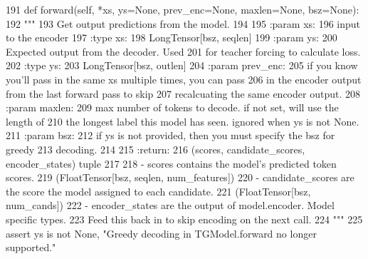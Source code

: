 \begin{DoxyCode}
191     \textcolor{keyword}{def }forward(self, *xs, ys=None, prev\_enc=None, maxlen=None, bsz=None):
192         \textcolor{stringliteral}{"""}
193 \textcolor{stringliteral}{        Get output predictions from the model.}
194 \textcolor{stringliteral}{}
195 \textcolor{stringliteral}{        :param xs:}
196 \textcolor{stringliteral}{            input to the encoder}
197 \textcolor{stringliteral}{        :type xs:}
198 \textcolor{stringliteral}{            LongTensor[bsz, seqlen]}
199 \textcolor{stringliteral}{        :param ys:}
200 \textcolor{stringliteral}{            Expected output from the decoder. Used}
201 \textcolor{stringliteral}{            for teacher forcing to calculate loss.}
202 \textcolor{stringliteral}{        :type ys:}
203 \textcolor{stringliteral}{            LongTensor[bsz, outlen]}
204 \textcolor{stringliteral}{        :param prev\_enc:}
205 \textcolor{stringliteral}{            if you know you'll pass in the same xs multiple times, you can pass}
206 \textcolor{stringliteral}{            in the encoder output from the last forward pass to skip}
207 \textcolor{stringliteral}{            recalcuating the same encoder output.}
208 \textcolor{stringliteral}{        :param maxlen:}
209 \textcolor{stringliteral}{            max number of tokens to decode. if not set, will use the length of}
210 \textcolor{stringliteral}{            the longest label this model has seen. ignored when ys is not None.}
211 \textcolor{stringliteral}{        :param bsz:}
212 \textcolor{stringliteral}{            if ys is not provided, then you must specify the bsz for greedy}
213 \textcolor{stringliteral}{            decoding.}
214 \textcolor{stringliteral}{}
215 \textcolor{stringliteral}{        :return:}
216 \textcolor{stringliteral}{            (scores, candidate\_scores, encoder\_states) tuple}
217 \textcolor{stringliteral}{}
218 \textcolor{stringliteral}{            - scores contains the model's predicted token scores.}
219 \textcolor{stringliteral}{              (FloatTensor[bsz, seqlen, num\_features])}
220 \textcolor{stringliteral}{            - candidate\_scores are the score the model assigned to each candidate.}
221 \textcolor{stringliteral}{              (FloatTensor[bsz, num\_cands])}
222 \textcolor{stringliteral}{            - encoder\_states are the output of model.encoder. Model specific types.}
223 \textcolor{stringliteral}{              Feed this back in to skip encoding on the next call.}
224 \textcolor{stringliteral}{        """}
225         \textcolor{keyword}{assert} ys \textcolor{keywordflow}{is} \textcolor{keywordflow}{not} \textcolor{keywordtype}{None}, \textcolor{stringliteral}{"Greedy decoding in TGModel.forward no longer supported."}

\end{DoxyCode}
